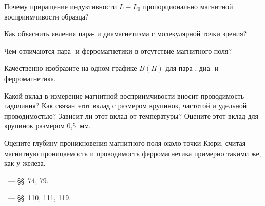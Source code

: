 \begin{lab:questions}

    \item Почему приращение индуктивности $L-L_0$ пропорционально магнитной
    восприимчивости образца?
	\item Как объяснить явления пара- и диамагнетизма с молекулярной точки
зрения?

	\item Чем отличаются пара- и ферромагнетики в отсутствие магнитного поля?


	\item Качественно изобразите на одном графике $B(H)$ для пара-, диа- и
ферромагнетика.

	\item Какой вклад в измерение магнитной восприимчивости вносит проводимость
гадолиния? Как связан этот вклад с размером крупинок, частотой и удельной
проводимостью? Зависит ли этот вклад от температуры? Оцените этот вклад для
крупинок размером 0,5~мм.
\item Оцените  глубину проникновения магнитного поля около точки Кюри, считая
магнитную проницаемость и проводимость ферромагнетика примерно такими же,
как у железа.
\end{lab:questions}


\begin{lab:literature}
	\item \SivuhinIII~--- \S\S~74, 79.

	\item \Kalashnikov~--- \S\S~110, 111, 119.
\end{lab:literature}

